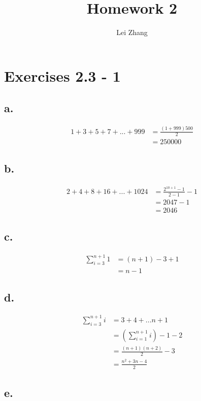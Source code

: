 \documentclass{article}
\title{Homework 2}
\author{Lei Zhang}
\begin{document}
\maketitle

\section{Exercises 2.3 - 1}

\subsection{a.}

\begin{align*}
1+ 3 + 5 + 7 + . . . + 999 &= \frac{(1+999)500}{2}\\
&= 250000
\end{align*}

\subsection{b.}

\begin{align*}
2 + 4 + 8 + 16 + . . . + 1024 &= \frac{2^{10+1}-1}{2-1} -1\\
&= 2047 - 1\\
&= 2046
\end{align*}

\subsection{c.}


\begin{align*}
\sum_{i=3}^{n+1}1 &= (n + 1) - 3 + 1 \\
&=  n-1
\end{align*}


\subsection{d.}

\begin{align*}
\sum_{i=3}^{n+1}i &=  3 + 4 + ... n+1\\
&=  (\sum_{i=1}^{n+1}i) - 1 -2\\
&=  \frac{(n+1)(n+2)}{2} -3\\
&=  \frac{n^2+3n-4}{2}
\end{align*}

\subsection{e.}
\end{document}
